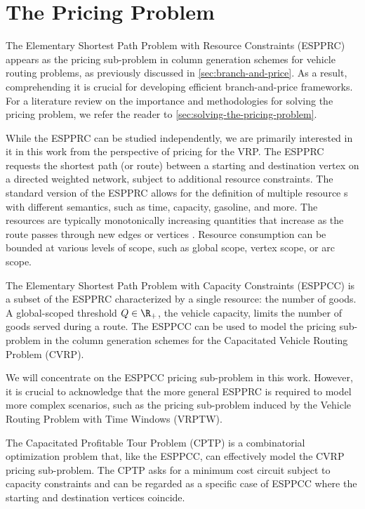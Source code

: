 \chapter{The Pricing Problem}
\label{sec:the-pricing-problem}

The Elementary Shortest Path Problem with Resource Constraints (ESPPRC)
appears as the pricing sub-problem in column generation schemes
for vehicle routing problems, as previously discussed in \cref{sec:branch-and-price}.
As a result, comprehending it is crucial for developing efficient branch-and-price frameworks.
For a literature review on the importance and methodologies
for solving the pricing problem,
we refer the reader to  \cref{sec:solving-the-pricing-problem}.

While the ESPPRC can be studied independently,
we are primarily interested in it in this work from the perspective of pricing for the VRP.
The ESPPRC requests the shortest path (or route)
between a starting and destination vertex on a directed weighted network,
subject to additional resource constraints.
The standard version of the ESPPRC allows for the definition of multiple resource
s with different semantics, such as time, capacity, gasoline, and more.
The resources are typically monotonically increasing quantities
that increase as the route passes through new edges or vertices \parencite{irnich2005, irnich2007resource}.
Resource consumption can be bounded at various levels of scope,
such as global scope, vertex scope, or arc scope.

The Elementary Shortest Path Problem with Capacity Constraints (ESPPCC)
is a subset of the ESPPRC characterized by a single resource: the number of goods.
A global-scoped threshold $Q \in \R_{+}$, the vehicle capacity,
limits the number of goods served during a route.
The ESPPCC can be used to model the pricing sub-problem in the column
generation schemes for the Capacitated Vehicle Routing Problem (CVRP).

We will concentrate on the ESPPCC pricing sub-problem in this work.
However,
it is crucial to acknowledge that the more general ESPPRC is required to model more complex scenarios,
such as the pricing sub-problem induced by the Vehicle Routing Problem with Time Windows (VRPTW).

The Capacitated Profitable Tour Problem (CPTP)
is a combinatorial optimization problem that, like the ESPPCC,
can effectively model the CVRP pricing sub-problem.
The CPTP asks for a minimum cost circuit subject to capacity constraints
and can be regarded as a specific case of ESPPCC where the starting
and destination vertices coincide.

